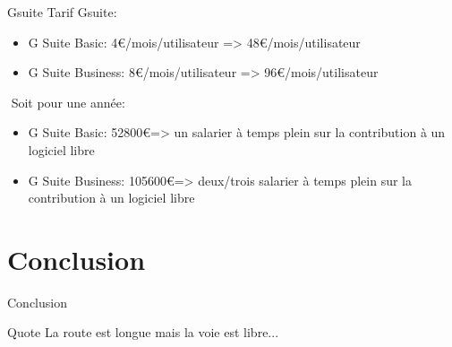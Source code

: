 \documentclass{beamer}
\begin{document}
\begin{frame}{Gsuite}
	Tarif Gsuite:
	\begin{itemize}
		\item G Suite Basic: 4\euro/mois/utilisateur => 48\euro/mois/utilisateur
		\item G Suite Business: 8\euro/mois/utilisateur => 96\euro/mois/utilisateur
	\end{itemize}

	$ $\newline
	Soit pour une année:\\
	\begin{itemize}
		\item G Suite Basic: 52800\euro\space => un salarier à temps plein sur la contribution à un logiciel libre
		\item G Suite Business: 105600\euro\space => deux/trois salarier à temps plein sur la contribution à un logiciel libre
	\end{itemize}
\end{frame}



\section{Conclusion}
\begin{frame}{Conclusion}
	\begin{block}{Quote}
		La route est longue mais la voie est libre...
	\end{block}
\end{frame}
\end{document}
